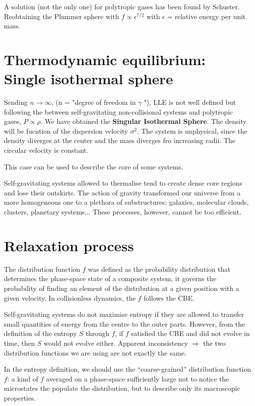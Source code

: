 \documentclass[a4paper,12pt]{article}
\begin{document}
A solution (not the only one) for polytropic gases has been found by Schuster. Reobtaining the Plummer sphere with $f \propto \epsilon^{7/2}$ with $\epsilon$ = relative energy per unit mass.




\section{Thermodynamic equilibrium: Single isothermal sphere}

Sending $n \longrightarrow \infty $, (n = "degree of freedom in $\gamma$ "), LLE is not well defined but following the between self-gravitating non-collisional systems and polytropic gases, $P \propto \rho$. We have obtained the \textbf{Singular Isothermal Sphere}. The density will be fucntion of the dispersion velocity $\sigma^2$. The system is unphysical, since the density diverges at the center and the mass diverges fro increasing radii. The circular velocity is constant.

This case can be used to describe the core of some systems.

Self-gravitating systems allowed to thermalise tend to create dense core regions and lose
their outskirts. The action of gravity transformed our universe from a more homogeneous one to a plethora of substructures: galaxies, molecular clouds, clusters, planetary systems... These processes, however, cannot be too efficient.


\section{Relaxation process}

The distribution function $f$ was defined as the probability distribution that determines the phase-space state of a composite system, it governs the probability of finding an element of the distribution at a given position with a given velocity. In collisionless dynamics, the $f$ follows the CBE.

Self-gravitating systems do not maximise entropy if they are allowed to transfer
small quantities of energy from the centre to the outer parts. However, from the definition of the entropy $S$ through $f$, if $f$ satisfied the CBE and did not evolve in time, then $S$ would not evolve either.
Apparent inconsistency $\Rightarrow$ the two distribution functions we are using are not exactly the same.

In the entropy definition, we should use the “coarse-grained” distribution function $f$: a kind of $f$ averaged on a phase-space sufficiently large not to notice the microstates the populate the distribution, but to describe only its macroscopic properties. 
\end{document}
